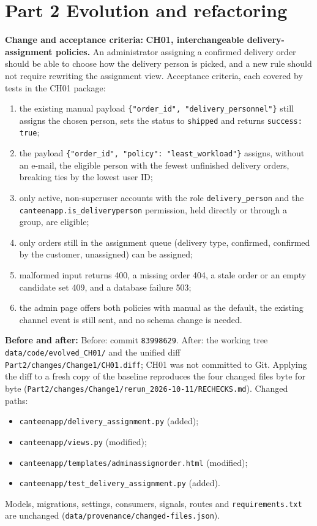 \documentclass[11pt,a4paper]{article}
\newcommand{\entry}[1]{\par\textbf{#1:} }
\newcommand{\code}[1]{\nolinkurl{#1}}
\begin{document}
\section{Part 2 Evolution and refactoring}\label{sec:part2}
\entry{Change and acceptance criteria}\textbf{CH01, interchangeable delivery-assignment policies.} An administrator assigning a confirmed delivery order should be able to choose how the delivery person is picked, and a new rule should not require rewriting the assignment view. Acceptance criteria, each covered by tests in the CH01 package:
\begin{enumerate}
\item the existing manual payload \texttt{\{"order\_id", "delivery\_personnel"\}} still assigns the chosen person, sets the status to \code{shipped} and returns \code{success: true};
\item the payload \texttt{\{"order\_id", "policy": "least\_workload"\}} assigns, without an e-mail, the eligible person with the fewest unfinished delivery orders, breaking ties by the lowest user ID;
\item only active, non-superuser accounts with the role \code{delivery_person} and the \code{canteenapp.is_deliveryperson} permission, held directly or through a group, are eligible;
\item only orders still in the assignment queue (delivery type, confirmed, confirmed by the customer, unassigned) can be assigned;
\item malformed input returns 400, a missing order 404, a stale order or an empty candidate set 409, and a database failure 503;
\item the admin page offers both policies with manual as the default, the existing channel event is still sent, and no schema change is needed.
\end{enumerate}
\entry{Before and after}Before: commit \code{83998629}. After: the working tree \code{data/code/evolved_CH01/} and the unified diff \code{Part2/changes/Change1/CH01.diff}; CH01 was not committed to Git. Applying the diff to a fresh copy of the baseline reproduces the four changed files byte for byte (\code{Part2/changes/Change1/rerun_2026-10-11/RECHECKS.md}). Changed paths:
\begin{itemize}
\item \code{canteenapp/delivery_assignment.py} (added);
\item \code{canteenapp/views.py} (modified);
\item \code{canteenapp/templates/adminassignorder.html} (modified);
\item \code{canteenapp/test_delivery_assignment.py} (added).
\end{itemize}
Models, migrations, settings, consumers, signals, routes and \code{requirements.txt} are unchanged (\code{data/provenance/changed-files.json}).
\end{document}
